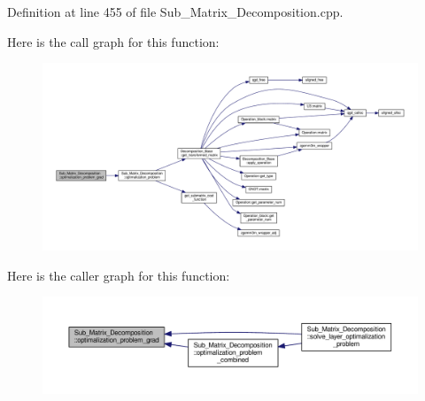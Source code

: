 Definition at line 455 of file Sub\+\_\+\+Matrix\+\_\+\+Decomposition.\+cpp.



Here is the call graph for this function\+:
\nopagebreak
\begin{figure}[H]
\begin{center}
\leavevmode
\includegraphics[width=350pt]{class_sub___matrix___decomposition_a8ba9ff25e30fc416363806401bb2362a_cgraph}
\end{center}
\end{figure}




Here is the caller graph for this function\+:
\nopagebreak
\begin{figure}[H]
\begin{center}
\leavevmode
\includegraphics[width=350pt]{class_sub___matrix___decomposition_a8ba9ff25e30fc416363806401bb2362a_icgraph}
\end{center}
\end{figure}


